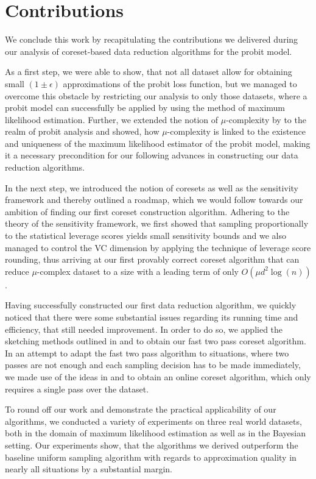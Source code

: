 \section{Contributions}

We conclude this work by recapitulating the contributions we delivered
during our analysis of coreset-based data reduction algorithms
for the probit model.

As a first step, we were able to show, that not all dataset allow
for obtaining small $(1 \pm \epsilon)$ approximations of the
probit loss function, but we
managed to overcome this obstacle by restricting our analysis to only
those datasets, where a probit model can successfully be applied
by using the method of maximum likelihood estimation.
Further, we extended the notion of $\mu$-complexity by
\cite{on-coresets} to the realm of probit analysis and showed, how
$\mu$-complexity is linked to the existence and uniqueness of the
maximum likelihood estimator of the probit model, making it a
necessary precondition for our following advances in constructing our
data reduction algorithms.

In the next step, we introduced the notion of coresets as well as
the sensitivity framework and thereby outlined a roadmap, which we
would follow towards our ambition of finding our first coreset
construction algorithm.
Adhering to the theory of the sensitivity framework, we first
showed that sampling proportionally to the statistical leverage
scores yields small sensitivity bounds and we also managed to
control the VC dimension by applying the technique of leverage
score rounding, thus arriving at our first provably correct
coreset algorithm that can reduce $\mu$-complex dataset to
a size with a leading term of only $O(\mu d^2 \log(n))$.

Having successfully constructed our first data reduction algorithm,
we quickly noticed that there were some substantial issues regarding
its running time and efficiency,
that still needed improvement. In order to do so, we applied the sketching
methods outlined in \cite{leverage-scores-drineas} and
\cite{woodruff-2017} to obtain our fast two pass coreset algorithm.
In an attempt to adapt the fast two pass algorithm to situations,
where two passes are not enough and each sampling decision has to
be made immediately, we made use of the ideas in
\cite{online-row-sampling} and \cite{tensor-factorization}
to obtain an online coreset algorithm, which only requires a single
pass over the dataset.

To round off our work and demonstrate the practical applicability
of our algorithms, we conducted a variety of experiments
on three real world datasets, both in the domain of maximum
likelihood estimation as well as in the Bayesian setting.
Our experiments show, that the algorithms we derived
outperform the baseline uniform sampling algorithm with
regards to approximation quality in
nearly all situations by a substantial margin.

